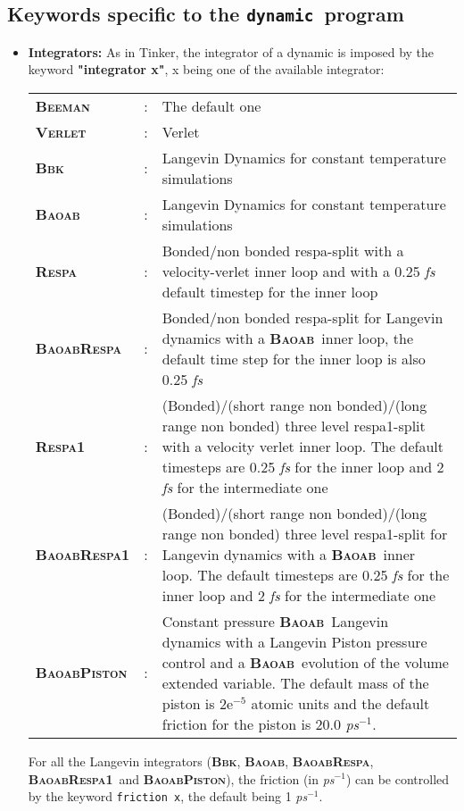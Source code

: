 \documentclass[peerreview]{IEEEtran}
\def\dynamic{\texttt{dynamic}}
\def\beeman{\textbf{\textsc{Beeman}}}
\def\verlet{\textbf{\textsc{Verlet}}}
\def\bbk{\textbf{\textsc{Bbk}}}
\def\baoab{\textbf{\textsc{Baoab}}}
\def\respa{\textbf{\textsc{Respa}}}
\def\baoabrespa{\textbf{\textsc{BaoabRespa}}}
\def\respaone{\textbf{\textsc{Respa1}}}
\def\baoabrespaone{\textbf{\textsc{BaoabRespa1}}}
\def\baoabpiston{\textbf{\textsc{BaoabPiston}}}
\begin{document}
\subsection{Keywords specific to the \dynamic\  program}
\begin{itemize}

\item \textbf{Integrators: } 
As in Tinker, the integrator of a dynamic is imposed by the keyword \textbf{"integrator x"}, x being one of the available integrator:

\setlength{\tabcolsep}{2pt}
\begin{tabular}{llp{14.60cm}}
\beeman &:& The default one\\
\verlet &: & Verlet\\
\bbk &: &Langevin Dynamics for constant temperature simulations\\
\baoab &: &Langevin Dynamics for constant temperature simulations\\
\respa &: &Bonded/non bonded respa-split with a velocity-verlet inner loop and with a 0.25 {\em fs} default timestep for the inner loop\\
\baoabrespa & : & Bonded/non bonded respa-split for Langevin dynamics with a \baoab\ inner loop, the default time step for the inner loop is also 0.25 {\em fs}\\
\respaone & : &(Bonded)/(short range non bonded)/(long range non bonded) three level respa1-split with a velocity verlet inner loop. The default timesteps are 0.25 {\em fs} for the inner loop and 2 {\em fs} for the intermediate one\\
\baoabrespaone &: &(Bonded)/(short range non bonded)/(long range non bonded) three level respa1-split for Langevin dynamics with a \baoab\ inner loop. The default timesteps are 0.25 {\em fs} for the inner loop and 2 {\em fs} for the intermediate one\\
\baoabpiston &:& Constant pressure \baoab\  Langevin dynamics with a Langevin Piston pressure control and a \baoab\  evolution of the volume extended variable. The default mass of the piston is 2e$^{-5}$ atomic units and the default friction for the piston is 20.0  {\em ps}$^{-1}$.\\
\end{tabular}

\vskip2.5mm
For all the Langevin integrators (\bbk, \baoab, \baoabrespa, \baoabrespaone\ and \baoabpiston), the friction (in  {\em ps}$^{-1}$) can be controlled by the keyword \texttt{friction x}, the default being 1  {\em ps}$^{-1}$.


\end{itemize}
\end{document}
